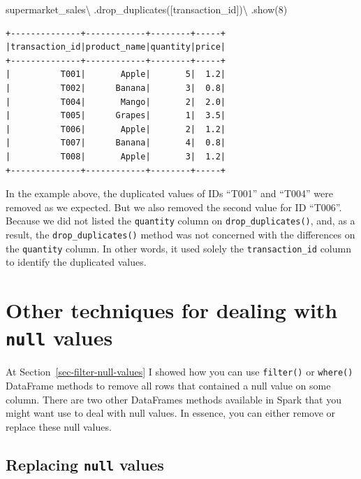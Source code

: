 \documentclass[
  11pt,
  letterpaper,
  DIV=11,
  numbers=noendperiod]{scrreprt}
\newenvironment{Shaded}{\begin{snugshade}}{\end{snugshade}}
\newcommand{\DecValTok}[1]{\textcolor[rgb]{0.68,0.00,0.00}{#1}}
\newcommand{\NormalTok}[1]{\textcolor[rgb]{0.00,0.23,0.31}{#1}}
\newcommand{\OperatorTok}[1]{\textcolor[rgb]{0.37,0.37,0.37}{#1}}
\newcommand{\StringTok}[1]{\textcolor[rgb]{0.13,0.47,0.30}{#1}}
\begin{document}
\begin{Shaded}
\begin{Highlighting}[]
\NormalTok{supermarket\_sales}\OperatorTok{\textbackslash{}}
\NormalTok{    .drop\_duplicates([}\StringTok{\textquotesingle{}transaction\_id\textquotesingle{}}\NormalTok{])}\OperatorTok{\textbackslash{}}
\NormalTok{    .show(}\DecValTok{8}\NormalTok{)}
\end{Highlighting}
\end{Shaded}

\begin{verbatim}
+--------------+------------+--------+-----+
|transaction_id|product_name|quantity|price|
+--------------+------------+--------+-----+
|          T001|       Apple|       5|  1.2|
|          T002|      Banana|       3|  0.8|
|          T004|       Mango|       2|  2.0|
|          T005|      Grapes|       1|  3.5|
|          T006|       Apple|       2|  1.2|
|          T007|      Banana|       4|  0.8|
|          T008|       Apple|       3|  1.2|
+--------------+------------+--------+-----+
\end{verbatim}

In the example above, the duplicated values of IDs ``T001'' and ``T004''
were removed as we expected. But we also removed the second value for ID
``T006''. Because we did not listed the \texttt{quantity} column on
\texttt{drop\_duplicates()}, and, as a result, the
\texttt{drop\_duplicates()} method was not concerned with the
differences on the \texttt{quantity} column. In other words, it used
solely the \texttt{transaction\_id} column to identify the duplicated
values.

\section{\texorpdfstring{Other techniques for dealing with \texttt{null}
values}{Other techniques for dealing with null values}}\label{other-techniques-for-dealing-with-null-values}

At Section~\ref{sec-filter-null-values} I showed how you can use
\texttt{filter()} or \texttt{where()} DataFrame methods to remove all
rows that contained a null value on some column. There are two other
DataFrames methods available in Spark that you might want use to deal
with null values. In essence, you can either remove or replace these
null values.

\subsection{\texorpdfstring{Replacing \texttt{null}
values}{Replacing null values}}\label{replacing-null-values}
\end{document}
